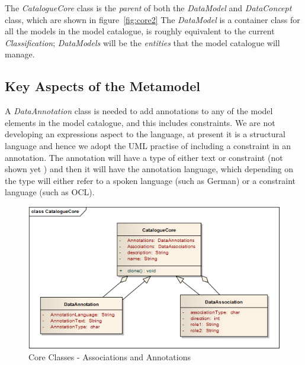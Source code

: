\documentclass{article}
\begin{document}



The \emph{CatalogueCore} class is the \emph{parent} of both the \emph{DataModel} and \emph{DataConcept} class, which are shown in figure~\ref{fig:core2} The \emph{DataModel} is a container class for all the models in the model catalogue, is roughly equivalent to the current \emph{Classification};  \emph{DataModels} will be the \emph{entities} that the model catalogue will manage.


\subsection{Key Aspects of the Metamodel}

A \emph{DataAnnotation} class is needed to add annotations to any of the model elements in the model catalogue, and this includes constraints. We are not developing an expressions aspect to the language, at present it is a structural language and hence we adopt the UML practise of including a constraint in an annotation. The annotation will have a type of either text or constraint (not shown yet ) and then it will have the annotation language, which depending on the type will either refer to a spoken language (such as German) or a constraint language (such as OCL).

\begin{figure}[here]
\includegraphics[scale=0.6]{diagrams/assan}
\caption{Core Classes - Associations and Annotations} 
\label{fig:assan}
\end{figure}
\end{document}

